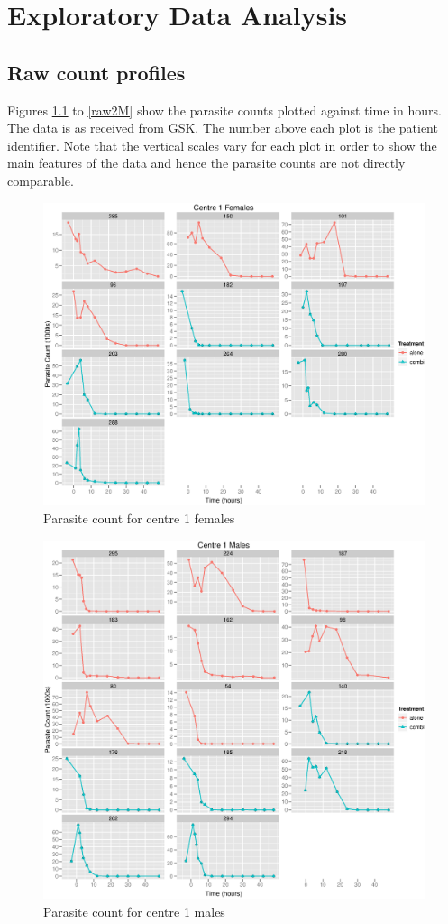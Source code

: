 \chapter{Exploratory Data Analysis}\label{data}

\section{Raw count profiles}
Figures \ref{raw1F} to \ref{raw2M} show the parasite counts plotted against time in hours. The data is as received from GSK. The number above each plot is the patient identifier. Note that the vertical scales vary for each plot in order to show the main features of the data and hence the parasite counts are not directly comparable.
\begin{figure}[h]
\centering
\includegraphics[width=6.1in]{raw1f.eps}
\caption{Parasite count for centre 1 females}\label{raw1F}
\end{figure} 
\begin{figure}[h]
\centering
\includegraphics[width=6.1in]{raw1m.eps}
\caption{Parasite count for centre 1 males}\label{raw1M}
\end{figure} 
